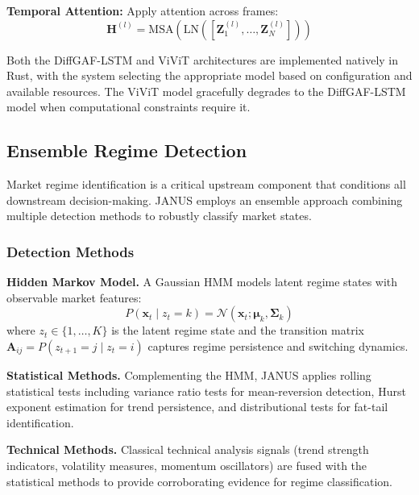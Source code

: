 \documentclass[12pt, a4paper]{article}
\begin{document}
\textbf{Temporal Attention:}
Apply attention across frames:
\begin{equation}
	\mathbf{H}^{(l)} = \text{MSA}(\text{LN}([\mathbf{Z}^{(l)}_1, \ldots, \mathbf{Z}^{(l)}_N]))
\end{equation}

Both the DiffGAF-LSTM and ViViT architectures are implemented natively in Rust, with the system selecting the appropriate model based on configuration and available resources. The ViViT model gracefully degrades to the DiffGAF-LSTM model when computational constraints require it.

\subsection{Ensemble Regime Detection}
\label{sec:regime_detection}

Market regime identification is a critical upstream component that conditions all downstream decision-making. JANUS employs an ensemble approach combining multiple detection methods to robustly classify market states.

\subsubsection{Detection Methods}
\label{sec:regime_methods}

\textbf{Hidden Markov Model.}
A Gaussian HMM models latent regime states with observable market features:
\begin{equation}
	P(\mathbf{x}_t \mid z_t = k) = \mathcal{N}(\mathbf{x}_t; \boldsymbol{\mu}_k, \boldsymbol{\Sigma}_k)
\end{equation}
where $z_t \in \{1, \ldots, K\}$ is the latent regime state and the transition matrix $\mathbf{A}_{ij} = P(z_{t+1} = j \mid z_t = i)$ captures regime persistence and switching dynamics.

\textbf{Statistical Methods.}
Complementing the HMM, JANUS applies rolling statistical tests including variance ratio tests for mean-reversion detection, Hurst exponent estimation for trend persistence, and distributional tests for fat-tail identification.

\textbf{Technical Methods.}
Classical technical analysis signals (trend strength indicators, volatility measures, momentum oscillators) are fused with the statistical methods to provide corroborating evidence for regime classification.
\end{document}
